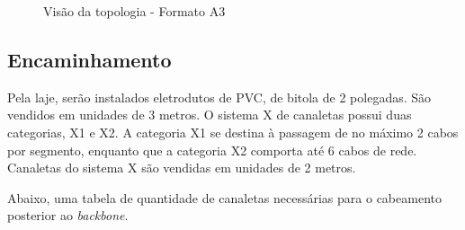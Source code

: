 \documentclass[	DIV=calc,%
							paper=a4,%
							fontsize=12pt,%
							onecolumn]{scrartcl}	 					%
\begin{document}
\begin{figure}
	\noindent{}
	\caption{Visão da topologia - Formato A3}
	\label{fig1}
\end{figure}

\clearpage
{}
\recalctypearea


\subsection{Encaminhamento}

Pela laje, serão instalados eletrodutos de PVC, de bitola de 2 polegadas. São vendidos em unidades de 3 metros. O sistema X de canaletas possui duas categorias, X1 e X2. A categoria X1 se destina à passagem de no máximo 2 cabos por segmento, enquanto que a categoria X2 comporta até 6 cabos de rede. Canaletas do sistema X são vendidas em unidades de 2 metros.

Abaixo, uma tabela de quantidade de canaletas necessárias para o cabeamento posterior ao \textit{backbone}.
\\

\end{document}
